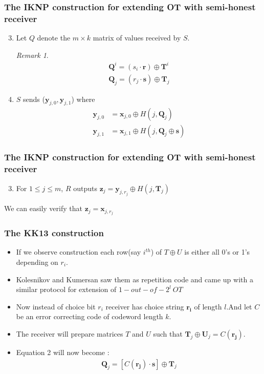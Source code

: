 \documentclass[hyperref={pdfpagelabels=false}]{beamer}
\theoremstyle{remark}
\newtheorem*{remark}{Remark}
\begin{document}
\begin{frame}
\frametitle{The IKNP construction for extending OT with semi-honest receiver}
\begin{enumerate}
\setcounter{enumi}{2}
\item Let $Q$ denote the $m \times k$ matrix of values received by $S$. \pause

\begin{remark}
\begin{align}
\mathbf{Q}^i = (s_i \cdot \mathbf{r}) \oplus \mathbf{T}^i \\
\mathbf{Q}_j = (r_j \cdot \mathbf{s}) \oplus \mathbf{T}_j
\end{align}
\end{remark}\pause
\item $S$ sends ($\mathbf{y}_{j,0}, \mathbf{y}_{j,1}$) where \pause
\begin{align*}
\mathbf{y}_{j,0} &= \mathbf{x}_{j,0} \oplus H(j,\mathbf{Q}_j) \\
\mathbf{y}_{j,1} &= \mathbf{x}_{j,1} \oplus H(j,\mathbf{Q}_j \oplus \mathbf{s})
\end{align*}

\end{enumerate}
\end{frame}

\begin{frame}
\frametitle{The IKNP construction for extending OT with semi-honest receiver}

\begin{enumerate}
\setcounter{enumi}{2}
\item For $1 \leq j \leq m$, $R$ outputs $\mathbf{z}_{j} = \mathbf{y}_{j,r_j} \oplus H(j, \mathbf{T}_{j})$\pause
\end{enumerate}
We can easily verify that $\mathbf{z}_{j} =\mathbf{x}_{j,r_j}$
\end{frame}


\begin{frame}
\frametitle{The KK13 construction}
\begin{itemize}
\item If we observe \cite{IKNP} construction each row(say $i^{th}$) of $T \oplus U$ is either all 0's or 1's depending on $r_i$. \pause
\item Kolesnikov and Kumersan saw them as repetition code and came up with a similar protocol for extension of $1-out-of-2^l\ OT$ \pause
\item Now instead of choice bit $r_i$ receiver has choice string $\mathbf{r_i}$ of length $l$.\pause And let $C$ be an error correcting code of codeword length $k$. \pause
\item The receiver will prepare matrices $T$ and $U$ such that $\mathbf{T}_j \oplus \mathbf{U}_j = C(\mathbf{r_j})$.
\item Equation 2 will now become :
\begin{align}
\mathbf{Q}_j = [ C(\mathbf{r_j}) \cdot \mathbf{s} ] \oplus \mathbf{T}_j
\end{align}

\end{itemize}
\end{frame}
\end{document}
